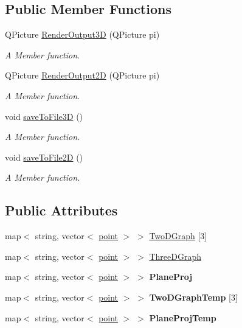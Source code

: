 \subsection*{Public Member Functions}
\begin{DoxyCompactItemize}
\item 
Q\+Picture \hyperlink{classOutput_aac99693b73661bf4af821aa5d32094ea}{Render\+Output3D} (Q\+Picture pi)
\begin{DoxyCompactList}\small\item\em A Member function. \end{DoxyCompactList}\item 
Q\+Picture \hyperlink{classOutput_aabbc20a5012e08ef1d242c2800ba8421}{Render\+Output2D} (Q\+Picture pi)
\begin{DoxyCompactList}\small\item\em A Member function. \end{DoxyCompactList}\item 
void \hyperlink{classOutput_aa16a2893d743f7c218c026efa3e65718}{save\+To\+File3D} ()
\begin{DoxyCompactList}\small\item\em A Member function. \end{DoxyCompactList}\item 
void \hyperlink{classOutput_aa9ea0df4774ce32a319bdb1b3a6712a8}{save\+To\+File2D} ()
\begin{DoxyCompactList}\small\item\em A Member function. \end{DoxyCompactList}\end{DoxyCompactItemize}
\subsection*{Public Attributes}
\begin{DoxyCompactItemize}
\item 
map$<$ string, vector$<$ \hyperlink{structpoint}{point} $>$ $>$ \hyperlink{classOutput_a24397893b0741447fdc351e5f66c2bfc}{Two\+D\+Graph} \mbox{[}3\mbox{]}
\item 
map$<$ string, vector$<$ \hyperlink{structpoint}{point} $>$ $>$ \hyperlink{classOutput_aae5a299ccc1830950c8e03cfe7863a4f}{Three\+D\+Graph}
\item 
map$<$ string, vector$<$ \hyperlink{structpoint}{point} $>$ $>$ {\bfseries Plane\+Proj}\hypertarget{classOutput_aecfac036be1c7e637a4be478604ba0dc}{}\label{classOutput_aecfac036be1c7e637a4be478604ba0dc}

\item 
map$<$ string, vector$<$ \hyperlink{structpoint}{point} $>$ $>$ {\bfseries Two\+D\+Graph\+Temp} \mbox{[}3\mbox{]}\hypertarget{classOutput_ab587641cf5674d83b02cf175c932e830}{}\label{classOutput_ab587641cf5674d83b02cf175c932e830}

\item 
map$<$ string, vector$<$ \hyperlink{structpoint}{point} $>$ $>$ {\bfseries Plane\+Proj\+Temp}\hypertarget{classOutput_aeab59c1c4e1e81f9df44657288561e99}{}\label{classOutput_aeab59c1c4e1e81f9df44657288561e99}

\end{DoxyCompactItemize}


